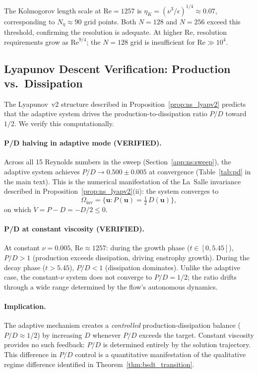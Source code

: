 \begin{remark}
The Kolmogorov length scale at $\mathrm{Re} = 1257$ is
$\eta_K = (\nu^3/\epsilon)^{1/4} \approx 0.07$,
corresponding to $N_{\eta} \approx 90$ grid points.
Both $N=128$ and $N=256$ exceed this threshold,
confirming the resolution is adequate.  At higher Re,
resolution requirements grow as $\mathrm{Re}^{9/4}$;
the $N=128$ grid is insufficient for $\mathrm{Re} \gg 10^4$.
\end{remark}

\subsection{Lyapunov Descent Verification: Production vs.\
Dissipation}\label{app:ns:lyapunov}

The Lyapunov~v2 structure described in
Proposition~\ref{prop:ns_lyapv2} predicts that the adaptive
system drives the production-to-dissipation ratio $P/D$
toward~$1/2$.  We verify this computationally.

\paragraph{P/D halving in adaptive mode (VERIFIED).}
Across all 15 Reynolds numbers in the sweep
(Section~\ref{app:ns:sweep}), the adaptive system
achieves $P/D \to 0.500 \pm 0.005$ at convergence
(Table~\ref{tab:pd} in the main text).  This is
the numerical manifestation of the La~Salle invariance
described in Proposition~\ref{prop:ns_lyapv2}(ii):
the system converges to
\[
  \Omega_{\mathrm{inv}} = \bigl\{\bm{u} :
  P(\bm{u}) = \tfrac{1}{2}\,D(\bm{u})\bigr\},
\]
on which $\dot{V} = P - D = -D/2 \le 0$.

\paragraph{P/D at constant viscosity (VERIFIED).}
At constant $\nu = 0.005$, $\mathrm{Re} \approx 1257$:
during the growth phase ($t \in [0, 5.45]$),
$P/D > 1$ (production exceeds dissipation, driving
enstrophy growth).  During the decay phase ($t > 5.45$),
$P/D < 1$ (dissipation dominates).  Unlike the adaptive
case, the constant-$\nu$ system does not converge to
$P/D = 1/2$; the ratio drifts through a wide range
determined by the flow's autonomous dynamics.

\paragraph{Implication.}
The adaptive mechanism creates a \emph{controlled}
production-dissipation balance ($P/D \approx 1/2$)
by increasing $D$ whenever $P/D$ exceeds the target.
Constant viscosity provides no such feedback: $P/D$
is determined entirely by the solution trajectory.
This difference in $P/D$ control is a quantitative
manifestation of the qualitative regime difference
identified in Theorem~\ref{thm:bsdt_transition}.

